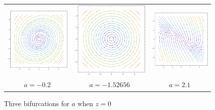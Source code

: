 \documentclass{article}
\begin{document}
\begin{figure}[h]
	\centering
	\begin{tabular}{c c c}
		\includegraphics[scale=0.4]{a_bifur_n0p2} &
		\includegraphics[scale=0.4]{a_bifur_n1p52656} &
		\includegraphics[scale=0.4]{a_bifur_2p1}\\
		$a=-0.2$ & $a=-1.52656$ & $a=2.1$
	\end{tabular}
	\caption{Three bifurcations for $a$ when $z=0$}
	\label{fig:a_bifur_01}
\end{figure}
\end{document}
